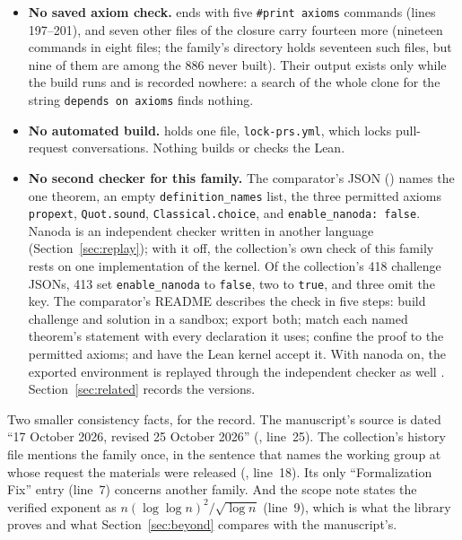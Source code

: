 \begin{itemize}
\item \textbf{No saved axiom check.} 
  ends with five \texttt{\#print axioms} commands (lines 197--201), and
  seven other files of the closure carry fourteen more (nineteen
  commands in eight files; the family's directory holds seventeen such
  files, but nine of them are among the 886 never built). Their output
  exists only while the build runs and is recorded nowhere: a search of
  the whole clone for the string \texttt{depends on axioms} finds
  nothing.
\item \textbf{No automated build.}  holds
  one file, \texttt{lock-prs.yml}, which locks pull-request
  conversations. Nothing builds or checks the Lean.
\item \textbf{No second checker for this family.} The comparator's JSON
  () names
  the one theorem, an empty \texttt{definition\_names} list, the three permitted
  axioms \texttt{propext}, \texttt{Quot.sound},
  \texttt{Classical.choice}, and \texttt{enable\_nanoda: false}. Nanoda
  is an independent checker written in another language
  (Section~\ref{sec:replay}); with it off, the collection's own check of
  this family rests on one implementation of the kernel. Of the
  collection's 418 challenge JSONs, 413 set \texttt{enable\_nanoda} to
  \texttt{false}, two to \texttt{true}, and three omit the key. The
  comparator's README describes the check in five steps: build challenge and
  solution in a sandbox; export both; match each named theorem's
  statement with every declaration it uses; confine the proof to the
  permitted axioms; and have the Lean kernel accept it. With nanoda on,
  the exported environment is replayed through the independent checker
  as well \citep{Nanoda}. Section~\ref{sec:related} records the
  versions.
\end{itemize}

Two smaller consistency facts, for the record. The manuscript's source
is dated ``17 October 2026, revised 25 October 2026''
(,
line~25). The collection's history file mentions the family once, in the
sentence that names the working group at whose request the materials
were released (, line~18). Its only
``Formalization Fix'' entry (line~7) concerns another family. And the
scope note  states the verified exponent as
$n(\log\log n)^2/\sqrt{\log n}$ (line~9), which is what the library
proves and what Section~\ref{sec:beyond} compares with the manuscript's.

